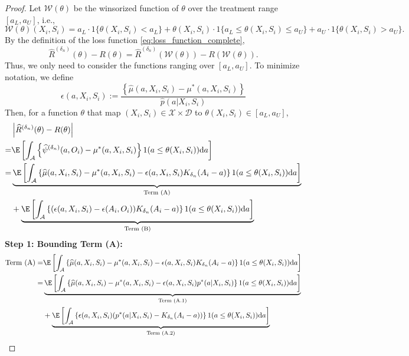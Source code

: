 \begin{proof} 
Let $\mathcal{W}(\theta)$ be the winsorized function of $\theta$ over the treatment range $[a_L,a_U]$, i.e., 
$$\mathcal{W}(\theta)(X_i,S_i) = a_L \cdot 1\{\theta(X_i,S_i)< a_L\} + \theta(X_i,S_i)\cdot 1\{a_L\leq \theta(X_i,S_i)\leq a_U\} + a_U \cdot 1\{\theta(X_i,S_i)> a_U\}.$$
By the definition of the loss function \eqref{eq:loss_function_complete}, 
$$\widehat R^{({\delta_n})}(\theta) - R(\theta) = \widehat R^{({\delta_n})}(\mathcal{W}(\theta)) - R(\mathcal{W}(\theta)).$$
Thus, we only need to consider the functions ranging over $[a_L,a_U]$. To minimize notation, we define
$$\epsilon(a,X_i,S_i) := \frac{\left\{\widehat\mu(a,X_i,S_i) - \mu^*(a,X_i,S_i)\right\} }{\widehat{p}(a|X_i,S_i)}$$
Then, for a function $\theta$ that map $(X_i,S_i)\in\mathcal{X}\times \mathcal{D}$ to $\theta(X_i,S_i)\in[a_L,a_U]$, 
\begin{align*}
    &\left| \widehat R^{({\delta_n})}(\theta) - R(\theta) \right|\nonumber\\
    = & \E\left[\int_{\mathcal{A}} \left\{\widehat{\psi}^{({\delta_n})}(a, O_i)- \mu^*(a, X_i,S_i)\right\}1(a\leq \theta(X_i,S_i))\mathrm{d}a\right]\nonumber\\
    = &  \underbrace{\E\left[\int_{\mathcal{A}} \left\{\widehat{\mu}(a,X_i,S_i) - \mu^*(a,X_i,S_i) - \epsilon(a,X_i,S_i) K_{\delta_n}(A_i-a)\right\}1(a\leq \theta(X_i,S_i))\mathrm{d}a\right]}_{\text{Term (A)}}
    \\ 
     & + \underbrace{\E\left[\int_{\mathcal{A}} \left\{(\epsilon(a,X_i,S_i) - \epsilon(A_i,O_i)) K_{\delta_n}(A_i-a)\right\}1(a\leq \theta(X_i,S_i))\mathrm{d}a\right]}_{\text{Term (B)}}
\end{align*}
\noindent \textbf{Step 1: Bounding Term (A):}
\noindent
\begin{align*}
\text{Term (A)} = &\E\left[\int_{\mathcal{A}} \left\{\widehat{\mu}(a,X_i,S_i) - \mu^*(a,X_i,S_i) - \epsilon(a,X_i,S_i) K_{\delta_n}(A_i-a)\right\}1(a\leq \theta(X_i,S_i))\mathrm{d}a\right]\\
=& \underbrace{\E\left[\int_{\mathcal{A}} \left\{\widehat{\mu}(a,X_i,S_i) - \mu^*(a,X_i,S_i) - \epsilon(a,X_i,S_i)p^*(a|X_i,S_i)\right\}1(a\leq \theta(X_i,S_i))\mathrm{d}a\right]}_{\text{Term (A.1)}}\\
&+\underbrace{\E\left[\int_{\mathcal{A}} \left\{ \epsilon(a,X_i,S_i)(p^*(a|X_i,S_i) - K_{\delta_n}(A_i-a))\right\}1(a\leq \theta(X_i,S_i))\mathrm{d}a\right]}_{\text{Term (A.2)}}
\end{align*}


\end{proof}
